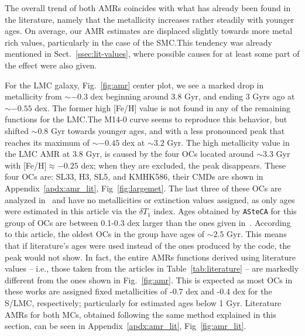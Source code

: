 \documentclass{aa}
\begin{document}
The overall trend of both AMRs coincides with what has already been found in the
literature, namely that the metallicity increases rather steadily with younger 
ages. On average, our AMR estimates are displaced slightly towards more metal
rich values, particularly in the case of the SMC.\@ This tendency was already
mentioned in Sect.~\ref{ssec:lit-values}, where possible causes for at least
some part of the effect were also given.

For the LMC galaxy, Fig.~\ref{fig:amr} center plot, we see a marked
drop in metallicity from ${\sim-}0.3$ dex beginning around 3.8 Gyr, and
ending 3 Gyrs ago at ${\sim-}0.55$ dex. The former high [Fe/H] value is not
found in any of the remaining functions for the LMC.\@ The M14-0 curve seems to
reproduce this behavior, but shifted ${\sim}0.8$ Gyr towards younger ages, and
with a less pronounced peak that reaches its maximum of ${\sim-}0.45$ dex at
${\sim}3.2$ Gyr.
%
The high metallicity value in the LMC AMR at 3.8 Gyr, is caused by the four OCs
located around ${\sim}3.3$ Gyr with [Fe/H]${\approx-0.25}$ dex; when they are
excluded, the peak disappears.
These four OCs are: SL33, H3, SL5, and KMHK586, their CMDs are shown in
Appendix~\ref{apdx:amr_lit}, Fig~\ref{fig:largemet}.
The last three of these OCs are analyzed in~\citet{Piatti_2011b} and have no
metallicities or extinction values assigned,
as only ages were estimated in this article via the $\delta T_1$ index.
Ages obtained by \texttt{ASteCA} for this group of OCs are between 0.1-0.3 dex
larger than the ones given in~\citet{Piatti_2011b}.
According to this article, the oldest OCs in the group have ages of ${\sim}2.5$
Gyr. This means that if literature's ages were used instead of the ones produced
by the code, the peak would not show.
In fact, the entire AMRs functions derived using literature values -- i.e.,
those taken from the articles in Table~\ref{tab:literature} -- are markedly
different from the ones shown in Fig.~\ref{fig:amr}.
This is expected as most OCs in these works are assigned fixed metallicities of
-0.7 dex and -0.4 dex for the S/LMC, respectively; particularly for estimated
ages below 1 Gyr. Literature AMRs for both MCs, obtained following the same
method explained in this section, can be seen in Appendix~\ref{apdx:amr_lit},
Fig~\ref{fig:amr_lit}.

\end{document}

